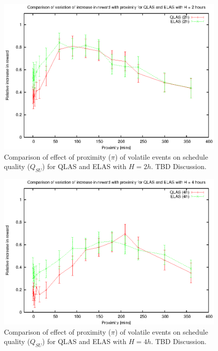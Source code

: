 \begin{figure}[htbp]
\begin{center}
    \includegraphics[scale=1.0, angle=0]{figures/evplot_2.eps}
\end{center}
\caption[Comparison of effect of proximity ($\pi$) of volatile events on schedule quality ($Q_{SU}$) for QLAS and ELAS ($H = 2h$).]
{Comparison of effect of proximity ($\pi$) of volatile events on schedule quality ($Q_{SU}$) for QLAS and ELAS with $H = 2h$. TBD Discussion.}
\label{fig:vol_qe2_pi}
\end{figure}

\begin{figure}[htbp]
\begin{center}
    \includegraphics[scale=1.0, angle=0]{figures/evplot_4.eps}
\end{center}
\caption[Comparison of effect of proximity ($\pi$) of volatile events on schedule quality ($Q_{SU}$) for QLAS and ELAS ($H = 4h$).]
{Comparison of effect of proximity ($\pi$) of volatile events on schedule quality ($Q_{SU}$) for QLAS and ELAS with $H = 4h$. TBD Discussion.}
\label{fig:vol_qe4_pi}
\end{figure}
